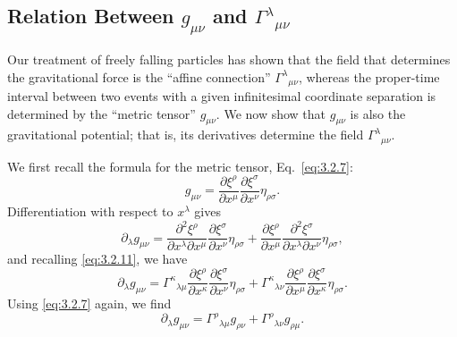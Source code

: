 
\subsection{Relation Between
\texorpdfstring{\(g_{\mu\nu}\)}{g} and
\texorpdfstring{\(\Gamma^\lambda{}_{\mu\nu}\)}{Gamma}}\label{sec:3.3}

Our treatment of freely falling particles has shown that the field that
determines the gravitational force is the ``affine connection''
$\Gamma^\lambda{}_{\mu\nu}$, whereas the proper-time interval between two
events with a given infinitesimal coordinate separation is determined by the
``metric tensor'' $g_{\mu\nu}$. We now show that $g_{\mu\nu}$ is also the
gravitational potential; that is, its derivatives determine the field
$\Gamma^\lambda{}_{\mu\nu}$.

We first recall the formula for the metric tensor, Eq.~\eqref{eq:3.2.7}:
\[
  g_{\mu\nu}
  =\frac{\partial\xi^\rho}{\partial x^\mu}
  \frac{\partial\xi^\sigma}{\partial x^\nu}\eta_{\rho\sigma}.
\]
Differentiation with respect to $x^\lambda$ gives
\[
  \partial_\lambda g_{\mu\nu}
  =
  \frac{\partial^2\xi^\rho}{\partial x^\lambda\partial x^\mu}
  \frac{\partial\xi^\sigma}{\partial x^\nu}\eta_{\rho\sigma}
  +
  \frac{\partial\xi^\rho}{\partial x^\mu}
  \frac{\partial^2\xi^\sigma}{\partial x^\lambda\partial x^\nu}
  \eta_{\rho\sigma},
\]
and recalling \eqref{eq:3.2.11}, we have
\[
  \partial_\lambda g_{\mu\nu}
  =
  \Gamma^\kappa{}_{\lambda\mu}
  \frac{\partial\xi^\rho}{\partial x^\kappa}
  \frac{\partial\xi^\sigma}{\partial x^\nu}\eta_{\rho\sigma}
  +
  \Gamma^\kappa{}_{\lambda\nu}
  \frac{\partial\xi^\rho}{\partial x^\mu}
  \frac{\partial\xi^\sigma}{\partial x^\kappa}\eta_{\rho\sigma}.
\]
Using \eqref{eq:3.2.7} again, we find
\begin{equation}
  \partial_\lambda g_{\mu\nu}
  =\Gamma^\rho{}_{\lambda\mu}g_{\rho\nu}
  +\Gamma^\rho{}_{\lambda\nu}g_{\rho\mu}.
  \tag{3.3.1}\label{eq:3.3.1}
\end{equation}

